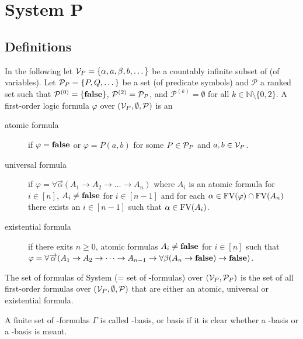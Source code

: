 \section{System P}
\subsection{Definitions}
In the following let $\mathcal{V}_P=\{\alpha,a,\beta,b,\dots\}$ be a countably infinite subset of \lambdaTypVar{} (of variables). 
Let $\mathcal{P}_P=\{P,Q,\dots\}$ be a set (of predicate symbols) and $\mathcal{P}$ a ranked set such that $\mathcal{P}^{(0)}=\{\textbf{false}\}$, $\mathcal{P}^{(2)}=\mathcal{P}_P$, and $\mathcal{P}^{(k)}=\emptyset$ for all $k\in\mathbb{N}\setminus\{0,2\}$.
A first-order logic formula $\varphi$ over $(\mathcal{V}_P,\emptyset,\mathcal{P})$ is an
\begin{description} %
	\item[atomic formula] if $\varphi=\textbf{false}$ or $\varphi=P(a,b)$ for some $P\in\mathcal{P}_P$ and $a,b\in\mathcal{V}_P$.
	\item[universal formula] if $\varphi=\forall\overrightarrow{\alpha}(A_1\to A_2 \to\dots\to A_n)$ where $A_i$ is an atomic formula for $i\in\left[n\right]$, $A_i\neq\textbf{false}$ for $i\in\left[n-1\right]$ and for each $\alpha\in\text{FV}(\varphi)\cap\text{FV}(A_n)$ there exists an $i\in\left[n-1\right]$ such that $\alpha\in\text{FV}(A_i)$.
	\item[existential formula] if there exits $n\ge0$,  atomic formulas $A_i\neq\textbf{false}$ for $i\in\left[n\right]$ such that $\varphi=\forall\overrightarrow{\alpha}(A_1\to A_2 \to\dots\to A_{n-1}\to\forall\beta(A_n\to\textbf{false})\to\textbf{false})$.
\end{description}
The set of formulas of System \SysP{} (= set of \SysP-formulas) over $(\mathcal{V}_P,\mathcal{P}_P)$ is the set of all first-order formulas over $(\mathcal{V}_P,\emptyset,\mathcal{P})$ that are either an atomic, universal or existential formula.

\begin{definition}
A finite set of \SysP-formulas $\Gamma$ is called \SysP-basis, or basis if it is clear whether a \SysP-basis or a \lambdaTwo-basis is meant.
\end{definition}

